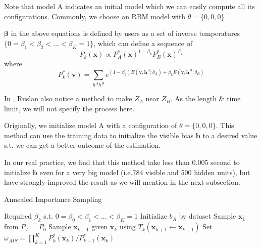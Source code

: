Note that model A indicates an initial model which we can easily compute all its configurations. Commonly, we choose an RBM model with $\theta = \{0,0,0\}$

$\mathbf \beta$ in the above equations is defined by users as a set of inverse temperatures $\{0= \beta_{1} < \beta_{2} < ... < \beta_{K} =1\}$, which can define a sequence of
\begin{equation}
P_{k}(\mathbf x) \propto P_{A}^{*}(\mathbf x)^{1-\beta_{k}} P_{B}^{*}(\mathbf x)^{\beta_{k}}
\end{equation}
where 
\begin{equation}
P^{*}_{k}(\mathbf v)=\sum_{h^{A}h^{B}}e^{(1-\beta_{k})E(\mathbf v, \mathbf h^{A};\theta_{A})+\beta_{k}E(\mathbf v,\mathbf h^{B};\theta_{B})}
\end{equation}


In \cite{salakhutdinov2009learning}, Ruslan also notice a method to make $Z_{A}$ near $Z_{B}$. As the length \& time limit, we will not specify the process here.

Originally, we initialize model A with a configuration of $\theta=\{0,0,0\}$. This method can use the training data to initialize the visible bias $\mathbf b$ to a desired value s.t. we can get a better outcome of the estimation.

In our real practice, we find that this method take less than 0.005 second to initialize $\mathbf b$ even for a very big model (i.e.784 visible and 500 hidden units), but have strongly improved the result as we will mention in the next subsection.


	\begin{algorithm}
        \caption{Annealed Importance Sampling}
        \begin{algorithmic}
        	\Require Required $\beta_{k}$ s.t. $0 = \beta_{0} < \beta_{1} < ... < \beta_{K} = 1$
        	\State Initialize $b_{A}$ by dataset
        	\State Sample $\mathbf x_{1}$ from $P_{A} = P_{0}$
                \State Sample $\mathbf x_{k+1}$ given $\mathbf x_{k}$ using $T_{k}(\mathbf x_{k+1} \longleftarrow \mathbf x_{k+1})$
			\EndFor
			\State Set $\omega_{AIS} = \prod_{k=1}^{K}P^{*}_{k}(\mathbf x_{k})/P^{*}_{k-1}(\mathbf x_{k})$
        \end{algorithmic}
    \end{algorithm}
